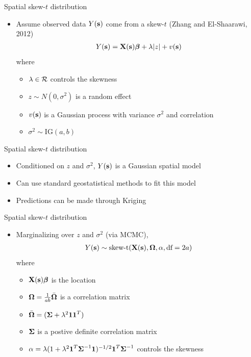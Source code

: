 \documentclass{beamer}
\begin{document}
\begin{frame}{Spatial skew-$t$ distribution}
  \begin{itemize} \setlength{\itemsep}{0.5em}
    \item Assume observed data $Y(\mbox{\bf s})$ come from a skew-$t$ (Zhang and El-Shaarawi, 2012)
    \begin{align*}
      Y(\mbox{\bf s}) = \mbox{\bf X}(\mbox{\bf s})\mbox{\boldmath $\beta$} + \lambda |z| + v(\mbox{\bf s})
    \end{align*}
    where
    \begin{itemize} \setlength{\itemsep}{0.25em}
      \item $\lambda \in {\cal R}$ controls the skewness
      \item $z \sim N(0, \sigma^2)$ is a random effect
      \item $v(\mbox{\bf s})$ is a Gaussian process with variance $\sigma^2$ and \Matern correlation
      \item $\sigma^2 \sim \text{IG}(a, b)$
    \end{itemize}
  \end{itemize}
\end{frame}

\begin{frame}{Spatial skew-$t$ distribution}
  \begin{itemize} \setlength{\itemsep}{0.5em}
   \item \alert{Conditioned} on $z$ and $\sigma^2$, $Y(\mbox{\bf s})$ is a Gaussian spatial model
    \item Can use standard geostatistical methods to fit this model
    \item Predictions can be made through Kriging
  \end{itemize}
\end{frame}

\begin{frame}{Spatial skew-$t$ distribution}
  \begin{itemize} \setlength{\itemsep}{0.5em}
    \item \alert{Marginalizing} over $z$ and $\sigma^2$ (via MCMC),
    \begin{align*}
      Y(\mbox{\bf s}) \sim \text{skew-t}(\mbox{\bf X}(\mbox{\bf s}), \mbox{\boldmath $\Omega$}, \alpha, \text{df}=2a)
    \end{align*}
    where
    \begin{itemize}
      \item $\mbox{\bf X}(\mbox{\bf s}) \mbox{\boldmath $\beta$}$ is the location
      \item $\mbox{\boldmath $\Omega$} = \frac{1}{ab} \bar{\mbox{\boldmath $\Omega$}}$ is a correlation matrix
      \item $\bar{\mbox{\boldmath $\Omega$}} = (\mbox{\boldmath $\Sigma$} + \lambda^2 \mbox{\boldmath $1$} \mbox{\boldmath $1$}^T)$
      \item $\mbox{\boldmath $\Sigma$}$ is a postive definite correlation matrix
      \item $\alpha = \lambda( 1 + \lambda^2 \mbox{\boldmath $1$}^T \mbox{\boldmath $\Sigma$}^{-1} \mbox{\boldmath $1$})^{-1/2} \mbox{\boldmath $1$}^T \mbox{\boldmath $\Sigma$}^{-1}$ controls the skewness
    \end{itemize}
  \end{itemize}
\end{frame}
\end{document}
